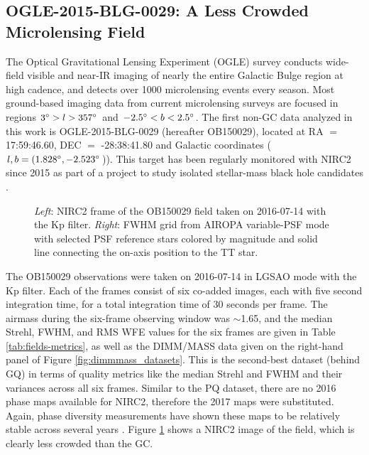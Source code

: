 \documentclass[]{spie}  %
\begin{document}
\subsection{OGLE-2015-BLG-0029: A Less Crowded Microlensing Field} \label{sec:ogle-data}
The Optical Gravitational Lensing Experiment (OGLE) survey \cite{udalski:1992a} conducts wide-field visible and near-IR imaging of nearly the entire Galactic Bulge region at high cadence, and detects over 1000 microlensing events every season. Most ground-based imaging data from current microlensing surveys are focused in regions $3\degree > l > 357\degree$ and $-2.5\degree < b < 2.5\degree$. The first non-GC data analyzed in this work is OGLE-2015-BLG-0029 (hereafter OB150029), located at RA $=$ 17:59:46.60, DEC $=$ -28:38:41.80 and Galactic coordinates ($l,b = (1.828\degree, -2.523\degree$)). This target has been regularly monitored with NIRC2 since 2015 as part of a project to study isolated stellar-mass black hole candidates \citep{lu:inprep}.

\begin{figure}[!h]
 \caption{\footnotesize \textit{Left}: NIRC2 frame of the OB150029 field taken on 2016-07-14 with the Kp filter. \textit{Right}: FWHM grid from AIROPA variable-PSF mode with selected PSF reference stars colored by magnitude and solid line connecting the on-axis position to the TT star.} \label{fig:ob150029}
\end{figure}

The OB150029 observations were taken on 2016-07-14 in LGSAO mode with the Kp filter. Each of the frames consist of six co-added images, each with five second integration time, for a total integration time of 30 seconds per frame. The airmass during the six-frame observing window was $\sim$1.65, and the median Strehl, FWHM, and RMS WFE values for the six frames are given in Table \ref{tab:fields-metrics}, as well as the DIMM/MASS data given on the right-hand panel of Figure \ref{fig:dimmmass_datasets}. This is the second-best dataset (behind GQ) in terms of quality metrics like the median Strehl and FWHM and their variances across all six frames. Similar to the PQ dataset, there are no 2016 phase maps available for NIRC2, therefore the 2017 maps were substituted. Again, phase diversity measurements have shown these maps to be relatively stable across several years \citep{Ciurlo:inprep}. Figure \ref{fig:ob150029} shows a NIRC2 image of the field, which is clearly less crowded than the GC. 
\end{document}
